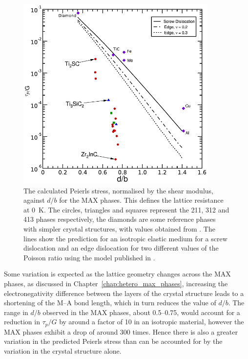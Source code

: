\begin{figure}
\centering
\includegraphics[width=10cm]{tp_vs_d_upon_b}
\captionsetup{width=12cm}
\caption[The calculated Peierls stresses of the MAX phases.]{The calculated Peierls stress, normalised by the shear modulus, against $d/b$ for the MAX phases. This defines the lattice resistance at \SI{0}{\kelvin}. The circles, triangles and squares represent the 211, 312 and 413 phases respectively, the diamonds are some reference phases with simpler crystal structures, with values obtained from \cite{Clegg2006}. The lines show the prediction for an isotropic elastic medium for a screw dislocation and an edge dislocation for two different values of the Poisson ratio using the model published in \cite{Clegg2006}.\label{fig:peierls_stress_vs_d_upon_b}}
\end{figure}


Some variation is expected as the lattice geometry changes across the MAX phases, as discussed in Chapter~\ref{chap:hetero_max_phases}, increasing the electronegativity difference between the layers of the crystal structure leads to a shortening of the M--A bond length, which in turn reduces the value of $d/b$. The range in $d/b$ observed in the MAX phases, about \numrange{0.5}{0.75}, would account for a reduction in $\tau_p / G $ by around a factor of \num{10} in an isotropic material, however the MAX phases exhibit a drop of around \num{300} times. Hence there is also a greater variation in the predicted Peierls stress than can be accounted for by the variation in the crystal structure alone. 


